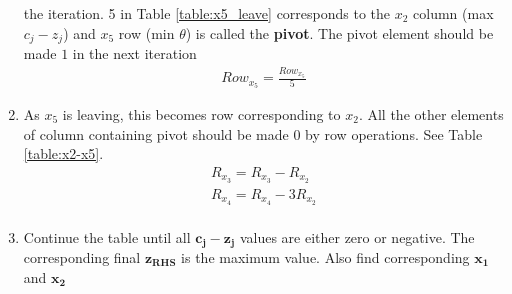 \documentclass[journal,12pt,twocolumn]{IEEEtran}
\begin{document}
\begin{enumerate}[1.]
the iteration. 5 in Table \ref{table:x5_leave} corresponds to the $x_2$ column (max $c_j - z_j$) and $x_5$ row (min $\theta$) is called the \textbf{pivot}.
The pivot element should be made $1$ in the next iteration
\begin{align}
Row_{x_5} = \frac{Row_{x_5}}{5}
\end{align}
\item As $x_5$ is leaving, this becomes row corresponding to $x_2$. 
All the other elements of column containing pivot should be made $0$ by row operations. See Table \ref{table:x2-x5}.
\begin{align}
R_{x_3} = R_{x_3} - R_{x_2}\\
R_{x_4} = R_{x_4} - 3R_{x_2}\\
\end{align}
\begin{table}[!h]
\begin{center}
\end{center}
\caption{}
\label{table:x2-x5}
\end{table}
\item Continue the table until all $\mathbf{c_j-z_j}$ values are either zero or negative. The corresponding final $\mathbf{z_{RHS}}$ is the maximum value. Also find corresponding $\mathbf{x_1}$ and $\mathbf{x_2}$

\end{enumerate}
\end{document}

